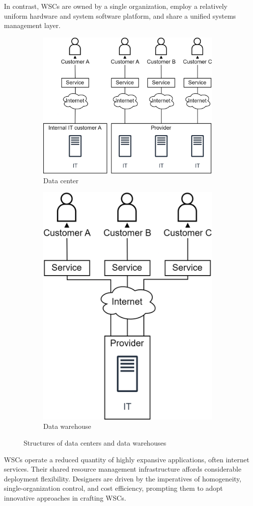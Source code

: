 In contrast, WSCs are owned by a single organization, employ a relatively uniform hardware and system software platform, and share a unified systems management layer.
\begin{figure}[H]
    \centering
    \begin{subfigure}{0.49\textwidth}
        \centering
        \includegraphics[width=0.75\linewidth]{images/datacenter.png} 
        \caption{Data center}
    \end{subfigure}
    \begin{subfigure}{0.49\textwidth}
        \centering
        \includegraphics[width=0.45\linewidth]{images/warehouse.png}
        \caption{Data warehouse}
    \end{subfigure}
    \caption{Structures of data centers and data warehouses}
\end{figure}
WSCs operate a reduced quantity of highly expansive applications, often internet services. 
Their shared resource management infrastructure affords considerable deployment flexibility. 
Designers are driven by the imperatives of homogeneity, single-organization control, and cost efficiency, prompting them to adopt innovative approaches in crafting WSCs.

